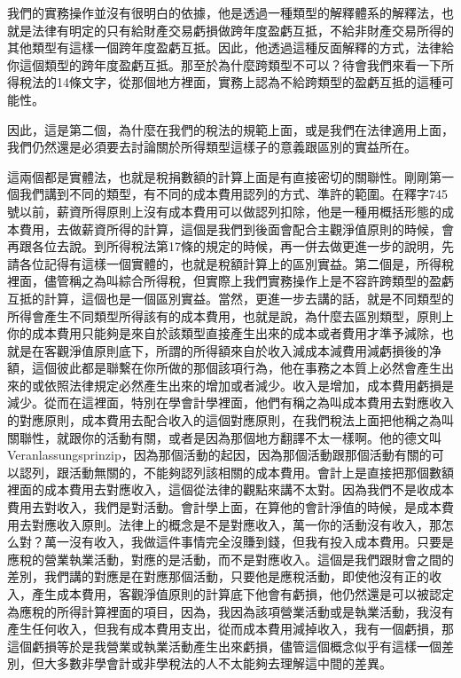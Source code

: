 \documentclass[]{ctexbook}
\begin{document}
我們的實務操作並沒有很明白的依據，他是透過一種類型的解釋體系的解釋法，也就是法律有明定的只有給財產交易虧損做跨年度盈虧互抵，不給非財產交易所得的其他類型有這樣一個跨年度盈虧互抵。因此，他透過這種反面解釋的方式，法律給你這個類型的跨年度盈虧互抵。那至於為什麼跨類型不可以？待會我們來看一下所得稅法的14條文字，從那個地方裡面，實務上認為不給跨類型的盈虧互抵的這種可能性。

因此，這是第二個，為什麼在我們的稅法的規範上面，或是我們在法律適用上面，我們仍然還是必須要去討論關於所得類型這樣子的意義跟區別的實益所在。

這兩個都是實體法，也就是稅捐數額的計算上面是有直接密切的關聯性。剛剛第一個我們講到不同的類型，有不同的成本費用認列的方式、準許的範圍。在釋字745號以前，薪資所得原則上沒有成本費用可以做認列扣除，他是一種用概括形態的成本費用，去做薪資所得的計算，這個是我們到後面會配合主觀淨值原則的時候，會再跟各位去說。到所得稅法第17條的規定的時候，再一併去做更進一步的說明，先請各位記得有這樣一個實體的，也就是稅額計算上的區別實益。第二個是，所得稅裡面，儘管稱之為叫綜合所得稅，但實際上我們實務操作上是不容許跨類型的盈虧互抵的計算，這個也是一個區別實益。當然，更進一步去講的話，就是不同類型的所得會產生不同類型所得該有的成本費用，也就是說，為什麼去區別類型，原則上你的成本費用只能夠是來自於該類型直接產生出來的成本或者費用才準予減除，也就是在客觀淨值原則底下，所謂的所得額來自於收入減成本減費用減虧損後的净額，這個彼此都是聯繫在你所做的那個該項行為，他在事務之本質上必然會產生出來的或依照法律規定必然產生出來的增加或者減少。收入是增加，成本費用虧損是減少。從而在這裡面，特別在學會計學裡面，他們有稱之為叫成本費用去對應收入的對應原則，成本費用去配合收入的這個對應原則，在我們稅法上面把他稱之為叫關聯性，就跟你的活動有關，或者是因為那個地方翻譯不太一樣啊。他的德文叫Veranlassungsprinzip，因為那個活動的起因，因為那個活動跟那個活動有關的可以認列，跟活動無關的，不能夠認列該相關的成本費用。會計上是直接把那個數額裡面的成本費用去對應收入，這個從法律的觀點來講不太對。因為我們不是收成本費用去對收入，我們是對活動。會計學上面，在算他的會計淨值的時候，是成本費用去對應收入原則。法律上的概念是不是對應收入，萬一你的活動沒有收入，那怎么對？萬一沒有收入，我做這件事情完全沒賺到錢，但我有投入成本費用。只要是應稅的營業執業活動，對應的是活動，而不是對應收入。這個是我們跟財會之間的差別，我們講的對應是在對應那個活動，只要他是應稅活動，即使他沒有正的收入，產生成本費用，客觀淨值原則的計算底下他會有虧損，他仍然還是可以被認定為應稅的所得計算裡面的項目，因為，我因為該項營業活動或是執業活動，我沒有產生任何收入，但我有成本費用支出，從而成本費用減掉收入，我有一個虧損，那這個虧損等於是我營業或執業活動產生出來虧損，儘管這個概念似乎有這樣一個差別，但大多數非學會計或非學稅法的人不太能夠去理解這中間的差異。
\end{document}
